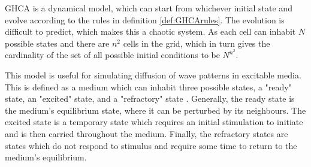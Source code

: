 GHCA is a dynamical model, which can start from whichever initial state and evolve according to the rules in definition \ref{def:GHCArules}.
The evolution is difficult to predict, which makes this a chaotic system.
As each cell can inhabit $N$ possible states and there are $n^2$ cells in the grid, which in turn gives the cardinality of the set of all possible initial conditions to be $N^{n^{2}}$.

This model is useful for simulating diffusion of wave patterns in excitable media.
This is defined as a medium which can inhabit three possible states, a "ready" state, an "excited" state, and a "refractory" state \cite{GreenbergHastings}.
Generally, the ready state is the medium's equilibrium state, where it can be perturbed by its neighbours.
The excited state is a temporary state which requires an initial stimulation to initiate and is then carried throughout the medium.
Finally, the refractory states are states which do not respond to stimulus and require some time to return to the medium's equilibrium.
